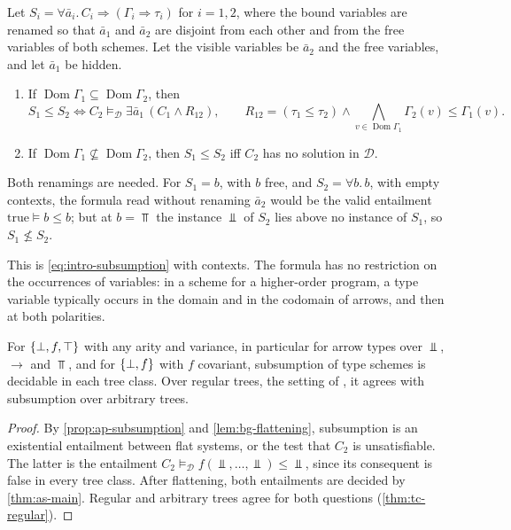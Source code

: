 \begin{proposition}\label{prop:ap-subsumption}
Let $S_i=\forall\bar a_i.\,C_i\Rightarrow(\Gamma_i\Rightarrow\tau_i)$ for
$i=1,2$, where the bound variables are renamed so that $\bar a_1$ and $\bar a_2$
are disjoint from each other and from the free variables of both schemes. Let
the visible variables be $\bar a_2$ and the free variables, and let $\bar a_1$
be hidden.
\begin{enumerate}[leftmargin=*]
\item If $\operatorname{Dom}\Gamma_1\subseteq\operatorname{Dom}\Gamma_2$, then
  \[
   S_1\le S_2\iff C_2\models_{\mathcal D}\exists\bar a_1\,(C_1\wedge R_{12}),
   \qquad
   R_{12}=(\tau_1\le\tau_2)\wedge
   \bigwedge_{v\in\operatorname{Dom}\Gamma_1}\Gamma_2(v)\le\Gamma_1(v).
  \]
\item If $\operatorname{Dom}\Gamma_1\not\subseteq\operatorname{Dom}\Gamma_2$,
  then $S_1\le S_2$ iff $C_2$ has no solution in $\mathcal D$.
\end{enumerate}
\end{proposition}

Both renamings are needed. For $S_1=b$, with $b$ free, and $S_2=\forall b.\,b$,
with empty contexts, the formula read without renaming $\bar a_2$ would be the
valid entailment $\mathrm{true}\models b\le b$; but at $b=\Top$ the instance
$\Bot$ of $S_2$ lies above no instance of $S_1$, so $S_1\not\le S_2$.

This is \cref{eq:intro-subsumption} with contexts. The formula has no
restriction on the occurrences of variables: in a scheme for a higher-order
program, a type variable typically occurs in the domain and in the codomain of
arrows, and then at both polarities.

\begin{corollary}\label{cor:ap-decidable}
For $\{\bot,f,\top\}$ with any arity and variance, in particular for arrow types over
$\Bot$, $\to$ and $\Top$, and for $\{\bot,f\}$ with $f$ covariant, subsumption of type
schemes is decidable in each tree class. Over regular trees, the setting of
\citet{TrifonovSmith96}, it agrees with subsumption over arbitrary trees.
\end{corollary}

\begin{proof}
By \cref{prop:ap-subsumption} and \cref{lem:bg-flattening}, subsumption is an
existential entailment between flat systems, or the test that $C_2$ is
unsatisfiable. The latter is the entailment
$C_2\models_{\mathcal D}f(\Bot,\ldots,\Bot)\le\Bot$, since its consequent is
false in every tree class. After flattening, both entailments are decided by
\cref{thm:as-main}. Regular and arbitrary trees agree for both questions
(\cref{thm:tc-regular}).
\end{proof}

